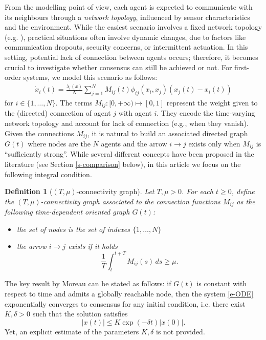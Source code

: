 \documentclass[journal]{article}
\newtheorem{definition}[lemma]{Definition}
\begin{document}
From the modelling point of view, each agent is expected to communicate with its neighbours through a \textit{network topology}, influenced by sensor characteristics and the environment. While the easiest scenario involves a fixed network topology (e.g. \cite{watts1998collective,olfati2007consensus}), practical situations often involve dynamic changes, due to factors like communication dropouts, security concerns, or intermittent actuation. In this setting, potential lack of connection between agents occurs; therefore, it becomes crucial to investigate whether consensus can still be achieved or not.  For first-order systems, we model this scenario as follows:
\begin{eqnarray}\label{e-ODE}
    \dot{x}_i(t) = \frac{\lambda_i(x)}{N}\sum_{j=1}^{N} M_{ij}(t)\phi_{ij}(x_i,x_j)(x_j(t) - x_i(t))
\end{eqnarray}
for $i \in \{1,\ldots,N\}$. The terms $M_{ij}:[0,+\infty)\mapsto [0,1]$ represent the weight given to the (directed) connection of agent $j$ with agent $i$. They encode the time-varying network topology and account for lack of connection (e.g., when they vanish). 
Given the connections $M_{ij}$, it is natural to build an associated directed graph $G(t)$ where nodes are the $N$ agents and the arrow $i\to j$ exists only when $M_{ij}$ is ``sufficiently strong''. While several different concepts have been proposed in the literature (see Section \ref{s-comparison} below), in this article we focus on the following integral condition.
 \begin{definition}[$(T,\mu)$-connectivity graph] \label{d-conngraph} Let $T,\mu>0$. For each $t\geq 0$, define the $(T,\mu)$-connectivity graph associated to the connection functions $M_{ij}$ as the following time-dependent oriented graph $G(t)$:
\begin{itemize}
\item the set of nodes is the set of indexes $\{1,\ldots,N\}$
\item the arrow $i\to j$ exists if it holds $$\frac1T \int_t^{t+T}M_{ij}(s)\,ds\geq \mu.$$
\end{itemize}
\end{definition}




The key result by Moreau \cite{moreau2004stability} can be stated as follows: if $G(t)$ is constant with respect to time and  admits a globally reachable node, then the system \eqref{e-ODE} exponentially converges to consensus for any initial condition, i.e. there exist $K,\delta>0$ such that the solution satisfies $$|x(t)|\leq K \exp(-\delta t) |x(0)|.$$ Yet, an explicit estimate of the parameters $K,\delta$ is not provided.
\end{document}
